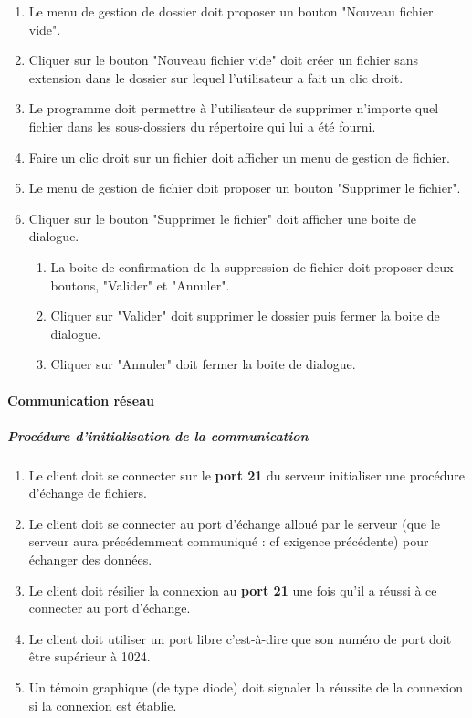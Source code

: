 \documentclass[10pt,a4paper]{report}
\begin{document}
\begin{enumerate}
		\item Le menu de gestion de dossier doit proposer un bouton "Nouveau fichier vide".
		\item Cliquer sur le bouton "Nouveau fichier vide" doit créer un fichier sans extension dans le dossier sur lequel l'utilisateur a fait un clic droit.
		\item Le programme doit permettre à l'utilisateur de supprimer n'importe quel fichier dans les sous-dossiers du répertoire qui lui a été fourni.
		\item Faire un clic droit sur un fichier doit afficher un menu de gestion de fichier.
		\item Le menu de gestion de fichier doit proposer un bouton "Supprimer le fichier".
		\item Cliquer sur le bouton "Supprimer le fichier" doit afficher une boite de dialogue.
		\begin{enumerate}[label=\arabic*.]
			\item La boite de confirmation de la suppression de fichier doit proposer deux boutons, "Valider" et "Annuler".
			\item Cliquer sur "Valider" doit supprimer le dossier puis fermer la boite de dialogue.
			\item Cliquer sur "Annuler" doit fermer la boite de dialogue.
		\end{enumerate}
	\end{enumerate}
	
\paragraph{Communication réseau}

	\subparagraph{Procédure d'initialisation de la communication}

		\begin{enumerate}

			\item Le client doit se connecter sur le \textbf{port 21} du serveur initialiser une procédure d'échange de fichiers.
			\item Le client doit se connecter au port d'échange alloué par le serveur (que le serveur aura précédemment communiqué : cf exigence précédente) pour échanger des données.
			\item Le client doit résilier la connexion au \textbf{port 21} une fois qu'il a réussi à ce connecter au port d'échange.
			\item Le client doit utiliser un port libre c'est-à-dire que son numéro de port doit être supérieur à 1024.
			\item Un témoin graphique (de type diode) doit signaler la réussite de la connexion si la connexion est établie. 
			\end{enumerate}
\end{document}
